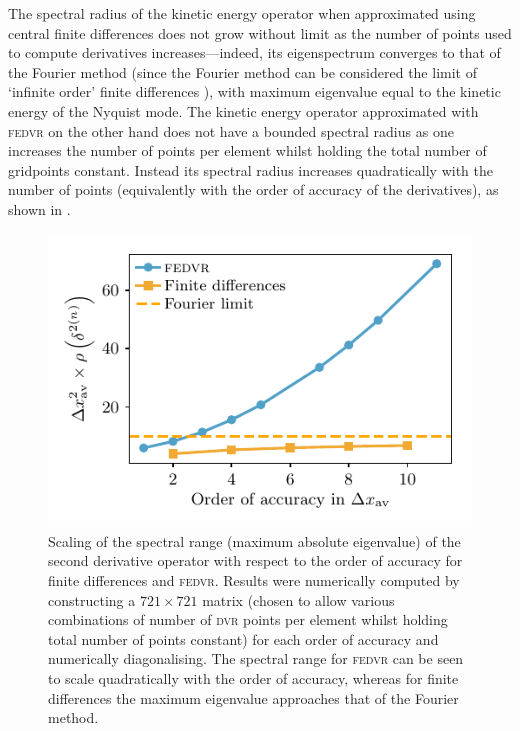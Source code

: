 The spectral radius of the kinetic energy operator when approximated using central finite differences does not grow without limit as the number of points used to compute derivatives increases---indeed, its eigenspectrum converges to that of the Fourier method (since the Fourier method can be considered the limit of `infinite order' finite differences \cite{fornberg_pseudospectral_1987}), with maximum eigenvalue equal to the kinetic energy of the Nyquist mode. The kinetic energy operator approximated with \textsc{fedvr} on the other hand does not have a bounded spectral radius as one increases the number of points per element whilst holding the total number of gridpoints constant. Instead its spectral radius increases quadratically with the number of points (equivalently with the order of accuracy of the derivatives), as shown in .

\begin{figure}[t]
    \centerfloat
    \includegraphics{figures/numerics/fedvr_eigenvalue_scaling.pdf}
    \caption{Scaling of the spectral range (maximum absolute eigenvalue) of the second derivative operator with respect to the order of accuracy for finite differences and \textsc{fedvr}. Results were numerically computed by constructing a $721\times721$ matrix (chosen to allow various combinations of number of \textsc{dvr} points per element whilst holding total number of points constant) for each order of accuracy and numerically diagonalising. The spectral range for \textsc{fedvr} can be seen to scale quadratically with the order of accuracy, whereas for finite differences the maximum eigenvalue approaches that of the Fourier method.}
    \label{fig:fedvr_eigenvalue_scaling}
\end{figure}

